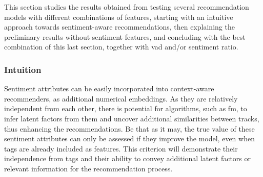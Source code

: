 This section studies the results obtained from testing several recommendation models with different combinations of features, starting with an intuitive approach towards sentiment-aware recommendations, then explaining the preliminary results without sentiment features, and concluding with the best combination of this last section, together with \acs{vad} and/or sentiment ratio.

\subsubsection{Intuition}

Sentiment attributes can be easily incorporated into context-aware recommenders, as additional numerical embeddings. As they are relatively independent from each other, there is potential for algorithms, such as \acl{fm}, to infer latent factors from them and uncover additional similarities between tracks, thus enhancing the recommendations. Be that as it may, the true value of these sentiment attributes can only be assessed if they improve the model, even when tags are already included as features. This criterion will demonstrate their independence from tags and their ability to convey additional latent factors or relevant information for the recommendation process.